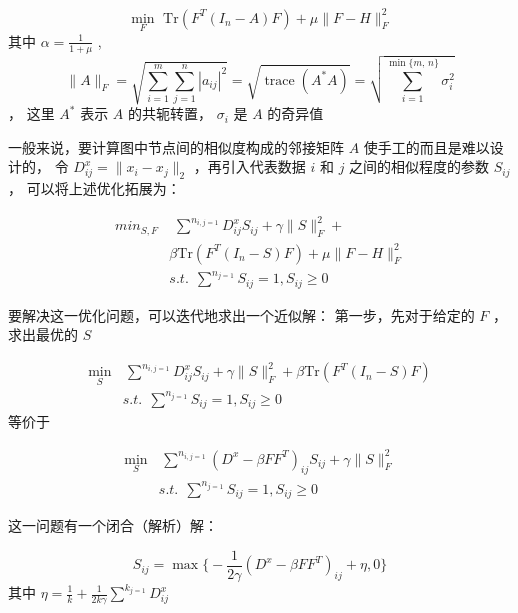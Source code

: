 \documentclass[color=gray,base=hide,cn]{elegantbook}
\begin{document}
\begin{equation}
\min_{F} \,\, \mathrm{Tr} (F^{T}(I_n - A) F) + \mu \|F - H\|^2_F
\end{equation}
其中 $\alpha = \frac{1}{1+\mu}$ , 
\begin{equation}
\|A\|_F=\sqrt{\sum_{i=1}^m\sum_{j=1}^n |a_{ij}|^2}=\sqrt{\operatorname{trace}(A^* A)}=\sqrt{\sum_{i=1}^{\min\{m,\,n\}} \sigma_{i}^2}
\end{equation}
，
这里 $A^*$ 表示 $A$ 的共轭转置， $\sigma_{i}$ 是 $A$ 的奇异值

一般来说，要计算图中节点间的相似度构成的邻接矩阵 $A$ 使手工的而且是难以设计的，
令 $D^x_{ij}=\|x_i-x_j\|_2$ ，再引入代表数据 $i$ 和 $j$ 之间的相似程度的参数 $S_{ij}$ ， 可以将上述优化拓展为：

\begin{equation}
\begin{aligned}
min_{S,F} & \,\,   \sum^n\nolimits_{i,j=1}D^x_{ij}S_{ij}+\gamma \|S\|^2_F+ \\ &  \beta \mathrm{Tr} (F^{T}(I_n - S) F) + \mu \|F - H\|^2_F  \\ &  s.t. \ \ \sum^n\nolimits_{j=1}S_{ij}=1, S_{ij}\geq 0 
\end{aligned}
\end{equation}

要解决这一优化问题，可以迭代地求出一个近似解：
第一步，先对于给定的 $F$ ，求出最优的 $S$

\begin{equation}
\begin{aligned}
\min_{S} & \, \sum^n\nolimits_{i,j=1}D^x_{ij}S_{ij}+\gamma \|S\|^2_F+ \beta \mathrm{Tr} (F^{T}(I_n - S) F)  
\\ & s.t. \ \ \sum^n\nolimits_{j=1}S_{ij}=1, S_{ij}\geq 0
\end{aligned}
\end{equation}
等价于

\begin{equation}
\begin{aligned}
\min_{S} & \, \sum^n\nolimits_{i,j=1}(D^x-\beta FF^T)_{ij}S_{ij}+\gamma \|S\|^2_F
\\ & s.t. \ \ \sum^n\nolimits_{j=1}S_{ij}=1, S_{ij}\geq 0
\end{aligned}
\end{equation}

这一问题有一个闭合（解析）解：

\begin{equation}
S_{ij} = \max\big\{-\frac{1}{2\gamma}(D^x - \beta FF^T)_{ij} + \eta, 0\big\}%
\end{equation}
其中 $\eta = \frac{1}{k} +\frac{1}{2k\gamma}\sum^k\nolimits_{j=1} D^x_{ij}$
\end{document}
